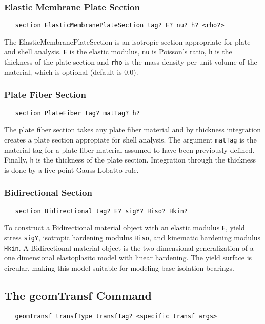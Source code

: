 \documentclass[12pt]{article}
\begin{document}
\subsubsection{Elastic Membrane Plate Section}
{\sf\small
\begin{verbatim}
   section ElasticMembranePlateSection tag? E? nu? h? <rho?>
\end{verbatim}
}
The ElasticMembranePlateSection
is an isotropic section appropriate for plate and shell analysis.
{\tt E} is the elastic modulus, {\tt nu} is Poisson's ratio, 
{\tt h} is the thickness of the plate section and
{\tt rho} is the mass density per unit \p volume of the material,
which is optional (default is 0.0).


\subsubsection{Plate Fiber Section}
{\sf\small
\begin{verbatim}
   section PlateFiber tag? matTag? h?
\end{verbatim}
}
The plate fiber section takes any plate fiber material and by 
thickness integration creates a plate section appropiate for shell analysis.
The argument {\tt matTag} is the material tag for a plate
fiber material assumed to have been previously defined. Finally,
{\tt h} is the thickness of the plate section. Integration through the
thickness is done by a five point Gauss-Lobatto rule.

\subsubsection{Bidirectional Section}
{\sf\small
\begin{verbatim}
   section Bidirectional tag? E? sigY? Hiso? Hkin?
\end{verbatim}
}

To construct a Bidirectional material object with an elastic modulus
{\tt E}, yield stress {\tt sigY}, isotropic hardening modulus {\tt Hiso},
and kinematic hardening modulus {\tt Hkin}. A Bidirectional material
object is the two dimensional generalization of a one dimensional
elastoplasitc model with linear hardening. The yield surface is circular,
making this model suitable for modeling base isolation bearings.

\subsection{The geomTransf Command}
{\sf\small
\begin{verbatim}
   geomTransf transfType transfTag? <specific transf args>
\end{verbatim}
}
\end{document}
